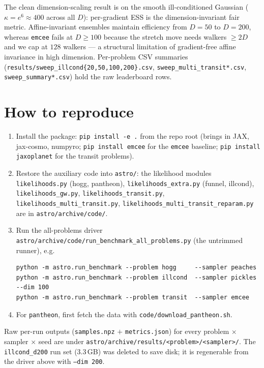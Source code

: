\documentclass[11pt]{article}
\begin{document}
The clean dimension-scaling result is on the smooth ill-conditioned Gaussian
($\kappa=e^6\!\approx\!400$ across all $D$): per-gradient ESS is the
dimension-invariant fair metric.  Affine-invariant ensembles maintain
efficiency from $D=50$ to $D=200$, whereas \texttt{emcee} fails at
$D\!\ge\!100$ because the stretch move needs walkers $\ge 2D$ and we cap at
$128$ walkers --- a structural limitation of gradient-free affine invariance
in high dimension.  Per-problem CSV summaries
(\texttt{results/sweep\_illcond\{20,50,100,200\}.csv},
\texttt{sweep\_multi\_transit*.csv}, \texttt{sweep\_summary*.csv}) hold the
raw leaderboard rows.

\section{How to reproduce}

\begin{enumerate}\setlength\itemsep{2pt}
\item Install the package: \texttt{pip install -e .} from the repo root
(brings in JAX, jax-cosmo, numpyro; \texttt{pip install emcee} for the
\texttt{emcee} baseline; \texttt{pip install jaxoplanet} for the transit
problems).
\item Restore the auxiliary code into \texttt{astro/}: the likelihood modules
\texttt{likelihoods.py} (hogg, pantheon), \texttt{likelihoods\_extra.py}
(funnel, illcond), \texttt{likelihoods\_gw.py}, \texttt{likelihoods\_transit.py},
\texttt{likelihoods\_multi\_transit.py},
\texttt{likelihoods\_multi\_transit\_reparam.py} are in
\texttt{astro/archive/code/}.
\item Run the all-problems driver
\texttt{astro/archive/code/run\_benchmark\_all\_problems.py} (the untrimmed
runner), e.g.
\begin{verbatim}
python -m astro.run_benchmark --problem hogg     --sampler peaches
python -m astro.run_benchmark --problem illcond  --sampler pickles --dim 100
python -m astro.run_benchmark --problem transit  --sampler emcee
\end{verbatim}
\item For \texttt{pantheon}, first fetch the data with
\texttt{code/download\_pantheon.sh}.
\end{enumerate}

\noindent
Raw per-run outputs (\texttt{samples.npz} $+$ \texttt{metrics.json}) for every
problem $\times$ sampler $\times$ seed are under
\texttt{astro/archive/results/<problem>/<sampler>/}.  The \texttt{illcond\_d200}
run set (3.3\,GB) was deleted to save disk; it is regenerable from the driver
above with \texttt{--dim 200}.
\end{document}
